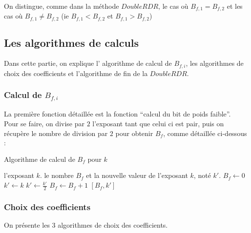 \documentclass[12pt, a4paper]{memoir}
\begin{document}
On distingue, comme dans la méthode $DoubleRDR$, le cas où $B_{f,1} = B_{f,2}$ et les cas où $B_{f,1} \neq B_{f,2}$
(ie $B_{f,1} < B_{f,2}$ et $B_{f,1} > B_{f,2}$)

\subsection{Les algorithmes de calculs}

Dans cette partie, on explique l' algorithme de calcul de $B_{f,i}$, les algorithmes de choix des coefficients
et l'algorithme de fin de la $DoubleRDR$.

\subsubsection{Calcul de $B_{f,i}$}

La première fonction détaillée est la fonction ``calcul du bit de poids faible''. \\
Pour se faire, on divise par $2$ l'exposant tant que celui ci est pair, puis on récupère le nombre de division par $2$
pour obtenir $B_{f}$, comme détaillée ci-dessous :

\begin{algorithm}
 \caption{Algorithme de calcul de $B_f$ pour $k$}
 \begin{algorithmic}
  \REQUIRE l'exposant $k$.
  \ENSURE le nombre $B_f$ et la nouvelle valeur de l'exposant $k$, noté $k'$.
  \STATE $B_f \leftarrow 0$
  \STATE $k' \leftarrow k$
  \STATE $k' \leftarrow \frac{k'}{2}$
  \STATE $B_f \leftarrow B_f + 1$
  \ENDWHILE
  \RETURN $[B_f,k']$
 \end{algorithmic}
\end{algorithm}

\subsubsection{Choix des coefficients}

On présente les $3$ algorithmes de choix des coefficients.
\end{document}
